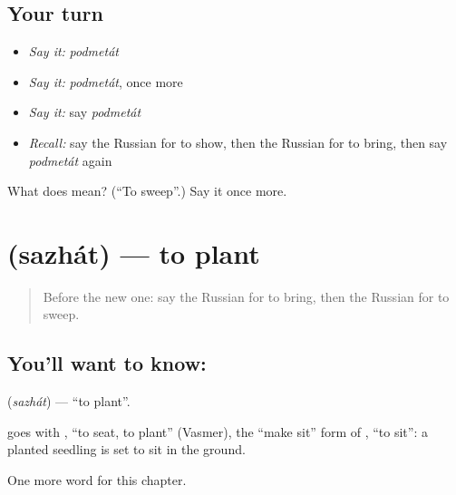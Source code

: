 \subsection*{Your turn}
\begin{itemize}
\raggedright
  \item \emph{Say it:} \emph{podmetát}
  \item \emph{Say it:} \emph{podmetát}, once more
  \item \emph{Say it:} say \emph{podmetát}
  \item \emph{Recall:} say the Russian for to show, then the Russian for to bring, then say \emph{podmetát} again
\end{itemize}

\begin{tcolorbox}[breakable,colback=teal!4,colframe=teal!35!black,title={Before you move on}]
What does  mean? (\textquotedblleft{}To sweep\textquotedblright{}.) Say it once more.
\end{tcolorbox}
\section[\texorpdfstring{\ru{сажать} (sazhát)}{сажать (sazhát)}]{ (sazhát) — to plant}

\label{lesson:RU-C234-sazhat}



\begin{quote}
Before the new one: say the Russian for to bring, then the Russian for to sweep.
\end{quote}

\subsection*{You'll want to know: }
\textbf{} (\emph{sazhát}) — \textquotedblleft{}to plant\textquotedblright{}.

\begin{cousinweb}
\textbf{} goes with \emph{}, \textquotedblleft{}to seat, to plant\textquotedblright{} (Vasmer), the \textquotedblleft{}make sit\textquotedblright{} form of \emph{}, \textquotedblleft{}to sit\textquotedblright{}: a planted seedling is set to sit in the ground.
\end{cousinweb}

\begin{grammarlens}[title={What you've built}]
One more word for this chapter.
\end{grammarlens}

